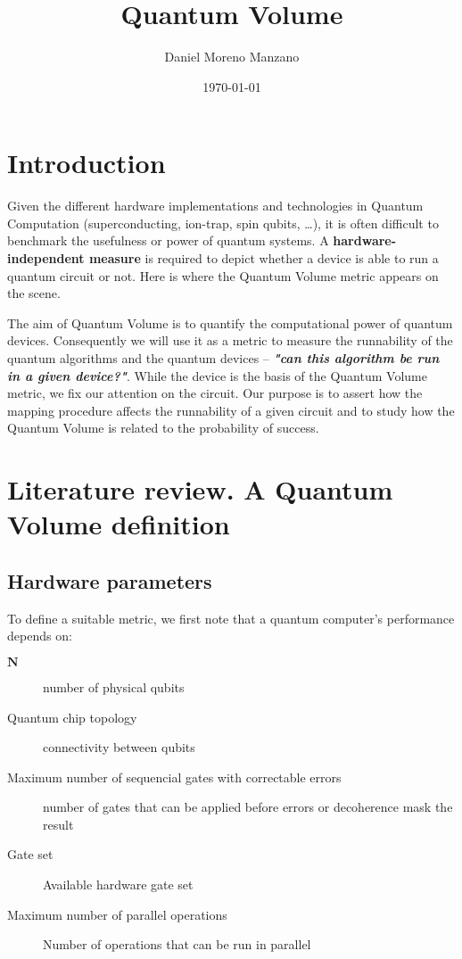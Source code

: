 \documentclass[11pt]{article}
\author{Daniel Moreno Manzano}
\date{\today}
\title{Quantum Volume}
\begin{document}
\maketitle


\section{Introduction}
\label{sec:orgda5981f}

Given the different hardware implementations and technologies in Quantum Computation (superconducting, ion-trap, spin qubits, \ldots{}), it is often difficult to benchmark the usefulness or power of quantum systems. 
A \textbf{hardware-independent measure} is required to depict whether a device is able to run a quantum circuit or not.
Here is where the Quantum Volume metric appears on the scene.

The aim of Quantum Volume is to quantify the computational power of quantum devices. 
Consequently we will use it as a metric to measure the runnability of the quantum algorithms and the quantum devices -- \emph{\textbf{"can this algorithm be run in a given device?"}}.
While the device is the basis of the Quantum Volume metric, we fix our attention on the circuit.
Our purpose is to assert how the mapping procedure affects the runnability of a given circuit and to study how the Quantum Volume is related to the probability of success.


\section{Literature review. A Quantum Volume definition}
\label{sec:orge6efe89}

\subsection{Hardware parameters}
\label{sec:org052a088}

To define a suitable metric, we first note that a quantum computer's performance depends on:

\begin{description}
\item[{\(\textbf{N}\)}] number of physical qubits
\item[{Quantum chip topology}] connectivity between qubits
\item[{Maximum number of sequencial gates with correctable errors}] number of gates that can be applied before errors or decoherence mask the result
\item[{Gate set}] Available hardware gate set
\item[{Maximum number of parallel operations}] Number of operations that can be run in parallel
\end{description}
\end{document}
